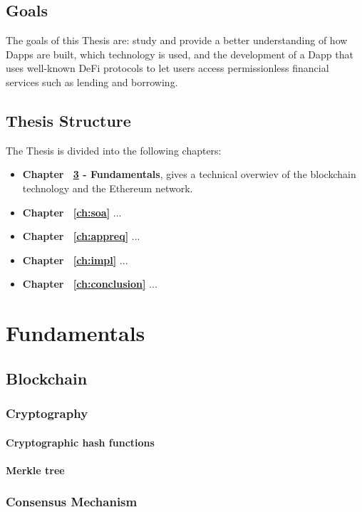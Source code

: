 \documentclass[11pt,a4paper]{report}
\begin{document}
\section{Goals}
The goals of this Thesis are:  study and provide a better understanding of how Dapps are built, which technology is used, and the development of a Dapp that uses well-known DeFi\cite{defi} protocols to let users access permissionless financial services such as lending and borrowing.

\section{Thesis Structure}
The Thesis is divided into the following chapters:
\begin{itemize}
	
	\item \textbf{Chapter ~\ref{ch:background} - Fundamentals}, gives a technical overwiev of the blockchain technology and the Ethereum network.
	\item \textbf{Chapter ~\ref{ch:soa}} ...
	\item \textbf{Chapter ~\ref{ch:appreq}} ...
	\item \textbf{Chapter ~\ref{ch:impl}} ...
	\item \textbf{Chapter ~\ref{ch:conclusion}} ...
\end{itemize}


\chapter{Fundamentals} \label{ch:background}

\section{Blockchain} \label{}
\subsection{Cryptography}
\subsubsection{Cryptographic hash functions}
\subsubsection{Merkle tree}
\subsection{Consensus Mechanism}
\end{document}

